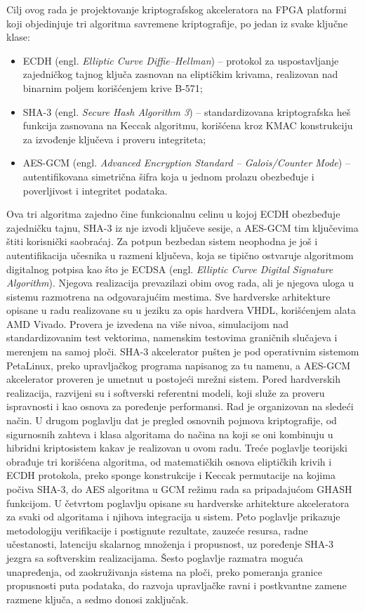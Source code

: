 \smallbreak
Cilj ovog rada je projektovanje kriptografskog akceleratora na FPGA platformi koji objedinjuje tri algoritma savremene kriptografije, po jedan iz svake ključne klase:
\begin{itemize}[itemsep=2pt]
    \item ECDH (engl. \textit{Elliptic Curve Diffie--Hellman}) -- protokol za uspostavljanje zajedničkog tajnog ključa zasnovan na eliptičkim krivama, realizovan nad binarnim poljem korišćenjem krive B-571;
    \item SHA-3 (engl. \textit{Secure Hash Algorithm 3}) -- standardizovana kriptografska heš funkcija zasnovana na Keccak algoritmu, korišćena kroz KMAC konstrukciju za izvođenje ključeva i proveru integriteta;
    \item AES-GCM (engl. \textit{Advanced Encryption Standard -- Galois/Counter Mode}) -- autentifikovana simetrična šifra koja u jednom prolazu obezbeđuje i poverljivost i integritet podataka.
\end{itemize}
\smallbreak
Ova tri algoritma zajedno čine funkcionalnu celinu u kojoj ECDH obezbeđuje zajedničku tajnu, SHA-3 iz nje izvodi ključeve sesije, a AES-GCM tim ključevima štiti korisnički saobraćaj. Za potpun bezbedan sistem neophodna je još i autentifikacija učesnika u razmeni ključeva, koja se tipično ostvaruje algoritmom digitalnog potpisa kao što je ECDSA (engl. \textit{Elliptic Curve Digital Signature Algorithm}). Njegova realizacija prevazilazi obim ovog rada, ali je njegova uloga u sistemu razmotrena na odgovarajućim mestima.
\smallbreak
Sve hardverske arhitekture opisane u radu realizovane su u jeziku za opis hardvera VHDL, korišćenjem alata AMD Vivado. Provera je izvedena na više nivoa, simulacijom nad standardizovanim test vektorima, namenskim testovima graničnih slučajeva i merenjem na samoj ploči. SHA-3 akcelerator pušten je pod operativnim sistemom PetaLinux, preko upravljačkog programa napisanog za tu namenu, a AES-GCM akcelerator proveren je umetnut u postojeći mrežni sistem. Pored hardverskih realizacija, razvijeni su i softverski referentni modeli, koji služe za proveru ispravnosti i kao osnova za poređenje performansi.
\smallbreak
Rad je organizovan na sledeći način. U drugom poglavlju dat je pregled osnovnih pojmova kriptografije, od sigurnosnih zahteva i klasa algoritama do načina na koji se oni kombinuju u hibridni kriptosistem kakav je realizovan u ovom radu.
\smallbreak
Treće poglavlje teorijski obrađuje tri korišćena algoritma, od matematičkih osnova eliptičkih krivih i ECDH protokola, preko sponge konstrukcije i Keccak permutacije na kojima počiva SHA-3, do AES algoritma u GCM režimu rada sa pripadajućom GHASH funkcijom.
\smallbreak
U četvrtom poglavlju opisane su hardverske arhitekture akceleratora za svaki od algoritama i njihova integracija u sistem.
\smallbreak
Peto poglavlje prikazuje metodologiju verifikacije i postignute rezultate, zauzeće resursa, radne učestanosti, latenciju skalarnog množenja i propusnost, uz poređenje SHA-3 jezgra sa softverskim realizacijama.
\smallbreak
Šesto poglavlje razmatra moguća unapređenja, od zaokruživanja sistema na ploči, preko pomeranja granice propusnosti puta podataka, do razvoja upravljačke ravni i postkvantne zamene razmene ključa, a sedmo donosi zaključak.
